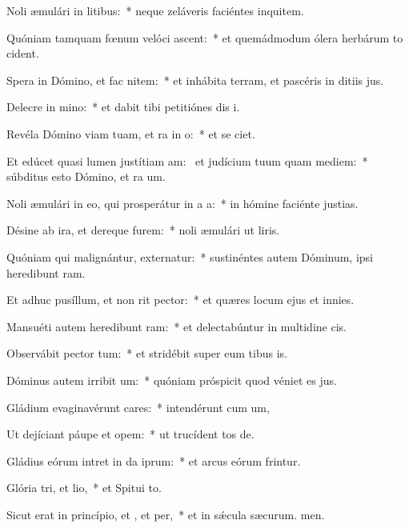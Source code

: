 \item Noli æmulári in litibus:~* neque zeláveris faciéntes inquitem.
\item Quóniam tamquam fœnum velóci ascent:~* et quemádmodum ólera herbárum to cident.
\item Spera in Dómino, et fac nitem:~* et inhábita terram, et pascéris in ditiis jus.
\item Delecre in mino:~* et dabit tibi petitiónes dis i.
\item Revéla Dómino viam tuam, et ra in o:~* et se ciet.
\item Et edúcet quasi lumen justítiam am:~\pscross{} et judícium tuum quam mediem:~* súbditus esto Dómino, et ra um.
\item Noli æmulári in eo, qui prosperátur in a a:~* in hómine faciénte justias.
\item Désine ab ira, et dereque furem:~* noli æmulári ut liris.
\item Quóniam qui malignántur, externatur:~* sustinéntes autem Dóminum, ipsi heredibunt ram.
\item Et adhuc pusíllum, et non rit pector:~* et quæres locum ejus et  innies.
\item Mansuéti autem heredibunt ram:~* et delectabúntur in multidine cis.
\item Observábit pector tum:~* et stridébit super eum tibus is.
\item Dóminus autem irribit um:~* quóniam próspicit quod véniet es jus.
\item Gládium evaginavérunt cares:~* intendérunt cum um,
\item Ut dejíciant páupe et opem:~* ut trucídent tos de.
\item Gládius eórum intret in da iprum:~* et arcus eórum frintur.
\item Glória tri, et lio,~* et Spitui to.
\item Sicut erat in princípio, et , et per,~* et in sǽcula sæcurum. men.
